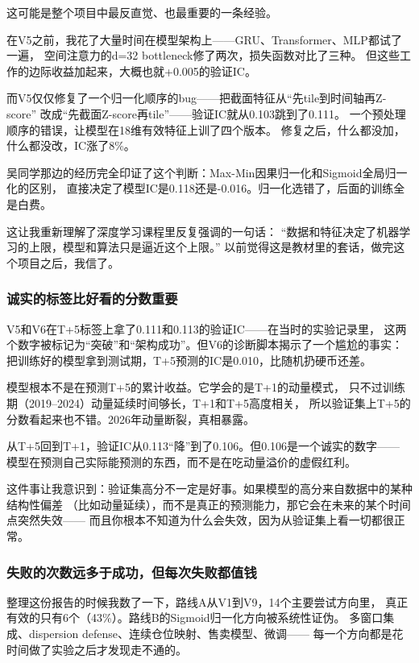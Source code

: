 \documentclass[12pt,a4paper]{ctexart}
\begin{document}
这可能是整个项目中最反直觉、也最重要的一条经验。

在V5之前，我花了大量时间在模型架构上——GRU、Transformer、MLP都试了一遍，
空间注意力的d=32 bottleneck修了两次，损失函数对比了三种。
但这些工作的边际收益加起来，大概也就+0.005的验证IC。

而V5仅仅修复了一个归一化顺序的bug——把截面特征从“先tile到时间轴再Z-score”
改成“先截面Z-score再tile”——验证IC就从0.103跳到了0.111。
一个预处理顺序的错误，让模型在18维有效特征上训了四个版本。
修复之后，什么都没加，什么都没改，IC涨了8\%。

吴同学那边的经历完全印证了这个判断：Max-Min因果归一化和Sigmoid全局归一化的区别，
直接决定了模型IC是0.118还是-0.016。归一化选错了，后面的训练全是白费。

这让我重新理解了深度学习课程里反复强调的一句话：
“数据和特征决定了机器学习的上限，模型和算法只是逼近这个上限。”
以前觉得这是教材里的套话，做完这个项目之后，我信了。

\subsubsection{诚实的标签比好看的分数重要}

V5和V6在T+5标签上拿了0.111和0.113的验证IC——在当时的实验记录里，
这两个数字被标记为“突破”和“架构成功”。但V6的诊断脚本揭示了一个尴尬的事实：
把训练好的模型拿到测试期，T+5预测的IC是0.010，比随机扔硬币还差。

模型根本不是在预测T+5的累计收益。它学会的是T+1的动量模式，
只不过训练期（2019--2024）动量延续时间够长，T+1和T+5高度相关，
所以验证集上T+5的分数看起来也不错。2026年动量断裂，真相暴露。

从T+5回到T+1，验证IC从0.113“降”到了0.106。但0.106是一个诚实的数字——
模型在预测自己实际能预测的东西，而不是在吃动量溢价的虚假红利。

这件事让我意识到：验证集高分不一定是好事。如果模型的高分来自数据中的某种结构性偏差
（比如动量延续），而不是真正的预测能力，那它会在未来的某个时间点突然失效——
而且你根本不知道为什么会失效，因为从验证集上看一切都很正常。

\subsubsection{失败的次数远多于成功，但每次失败都值钱}

整理这份报告的时候我数了一下，路线A从V1到V9，14个主要尝试方向里，
真正有效的只有6个（43\%）。路线B的Sigmoid归一化方向被系统性证伪。
多窗口集成、dispersion defense、连续仓位映射、售卖模型、微调——
每一个方向都是花时间做了实验之后才发现走不通的。
\end{document}
